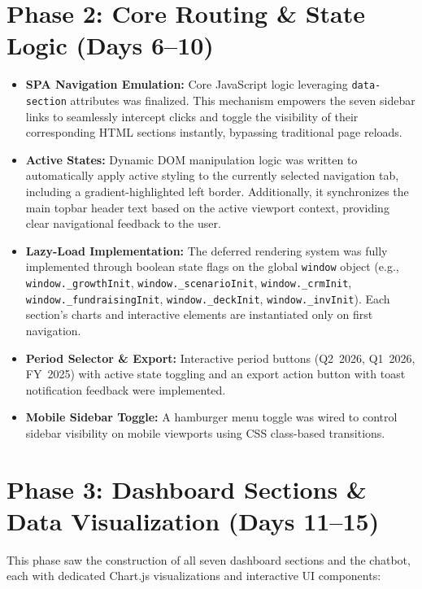 \documentclass{book}
\begin{document}
\section{Phase 2: Core Routing \& State Logic (Days 6--10)}
\begin{itemize}
    \item \textbf{SPA Navigation Emulation:} Core JavaScript logic leveraging \texttt{data-section} attributes was finalized. This mechanism empowers the seven sidebar links to seamlessly intercept clicks and toggle the visibility of their corresponding HTML sections instantly, bypassing traditional page reloads.
    \item \textbf{Active States:} Dynamic DOM manipulation logic was written to automatically apply active styling to the currently selected navigation tab, including a gradient-highlighted left border. Additionally, it synchronizes the main topbar header text based on the active viewport context, providing clear navigational feedback to the user.
    \item \textbf{Lazy-Load Implementation:} The deferred rendering system was fully implemented through boolean state flags on the global \texttt{window} object (e.g., \texttt{window.\_growthInit}, \texttt{window.\_scenarioInit}, \texttt{window.\_crmInit}, \texttt{window.\_fundraisingInit}, \texttt{window.\_deckInit}, \texttt{window.\_invInit}). Each section's charts and interactive elements are instantiated only on first navigation.
    \item \textbf{Period Selector \& Export:} Interactive period buttons (Q2~2026, Q1~2026, FY~2025) with active state toggling and an export action button with toast notification feedback were implemented.
    \item \textbf{Mobile Sidebar Toggle:} A hamburger menu toggle was wired to control sidebar visibility on mobile viewports using CSS class-based transitions.
\end{itemize}

\section{Phase 3: Dashboard Sections \& Data Visualization (Days 11--15)}
This phase saw the construction of all seven dashboard sections and the chatbot, each with dedicated Chart.js visualizations and interactive UI components:
\end{document}
